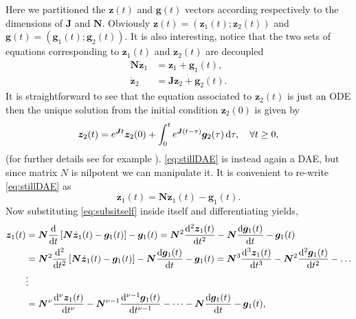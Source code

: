 		Here we partitioned the $\bm{z}(t)$ and $\bm{g}(t)$ vectors according respectively to the dimensions of  $\bm{J}$ and $\bm{N}$. Obviously $\bm{z}(t) = (\bm{z}_{1}(t);\bm{z}_{2}(t))$ and $\bm{g}(t) = (\bm{g}_{1}(t);\bm{g}_{2}(t))$. It is also interesting, notice that the two sets of equations corresponding to $\bm{z}_{1}(t)$ and $\bm{z}_{2}(t)$ are decoupled
		\begin{subequations}
			\begin{align}
				\label{eq:stillDAE}
				\bm{N}\dot{\bm{z}}_{1} 	&= \bm{z}_{1} + \bm{g}_{1}(t), \\
				\dot{\bm{z}}_{2} 	&= \bm{J}\bm{z}_{2} + \bm{g}_{2}(t).
			\end{align}
		\end{subequations}
		It is straightforward to see that the equation associated to $\bm{z}_{2}(t)$ is just an ODE then the unique solution  from the initial condition $\bm{z}_{2}(0)$ is given by
		\begin{equation}
			\bm{z}_{2}(t) = e^{\bm{J}t}\bm{z}_{2}(0)+\int_{0}^{t}e^{\bm{J}(t-\tau)}\bm{g}_{2}(\tau)\mathop{}\!\mathrm{d}\tau,\quad \forall t\geq 0,
		\end{equation}
		(for further details see for example \cite{hespanha2009linear}). \cref{eq:stillDAE} is instead again a DAE, but since matrix $N$ is nilpotent we can manipulate it. It is convenient to re-write \cref{eq:stillDAE} as
		\begin{equation}
			\label{eq:subsitself}
			\bm{z}_{1}(t) = \bm{N}\dot{\bm{z}}_{1}(t) - \bm{g}_{1}(t).
		\end{equation}
		Now substituting \cref{eq:subsitself} inside itself and 
		differentiating yields,
		\begin{subequations}
			\begin{align*}
				\bm{z}_{1}(t) &= \bm{N}\frac{\diff}{\diff t}\left[\bm{N}\dot{\bm{z}}_{1}(t)-\bm{g}_{1}(t)\right]-\bm{g}_{1}(t) = \bm{N}^{2}\frac{\diff^{2}\bm{z}_{1}(t)}{\diff t^{2}}-\bm{N}\frac{\diff \bm{g}_{1}(t)}{\diff t}-\bm{g}_{1}(t) \\
				  &= \bm{N}^{2}\frac{\diff^{2}}{\diff t^{2}}\left[\bm{N}\dot{\bm{z}}_{1}(t)-\bm{g}_{1}(t)\right]-\bm{N}\frac{\diff \bm{g}_{1}(t)}{\diff t}-\bm{g}_{1}(t) = \bm{N}^3\frac{\diff^{3}\bm{z}_{1}(t)}{\diff t^{3}}-\bm{N}^2\frac{\diff^{2} \bm{g}_{1}(t)}{\diff t^{2}}-\dots \\
				  &\vdots \\
				  & = \bm{N}^{\nu}\frac{\diff^{\nu}\bm{z}_{1}(t)}{\diff t^{\nu}} - \bm{N}^{\nu-1}\frac{\diff^{\nu-1} \bm{g}_{1}(t)}{\diff t^{\nu-1}}-\dots-\bm{N}\frac{\diff \bm{g}_{1}(t)}{\diff t} - \bm{g}_{1}(t),
			\end{align*}
		\end{subequations}

